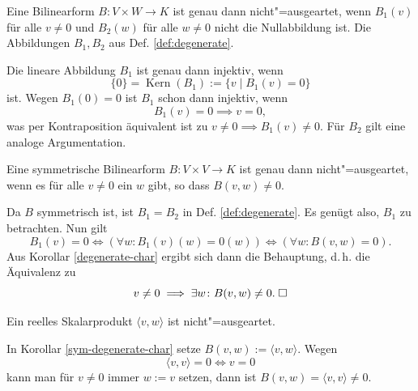 \begin{Korollar}\label{degenerate-char}
Eine Bilinearform $B\colon V\times W\to K$ ist genau dann
nicht"=ausgeartet, wenn $B_1(v)$ für alle $v\ne 0$ und $B_2(w)$ für
alle $w\ne 0$ nicht die Nullabbildung ist. Die Abbildungen $B_1,B_2$
aus Def. \ref{def:degenerate}.
\end{Korollar}
\begin{Beweis}
Die lineare Abbildung $B_1$ ist genau dann injektiv, wenn
\begin{equation}
\{0\} = \operatorname{Kern}(B_1) := \{v\mid B_1(v)=0\}
\end{equation}
ist. Wegen $B_1(0)=0$ ist $B_1$ schon dann injektiv, wenn
\begin{equation}
B_1(v)=0\implies v=0,
\end{equation}
was per Kontraposition äquivalent ist zu $v\ne 0\implies B_1(v)\ne 0$.
Für $B_2$ gilt eine analoge Argumentation.\;\qedsymbol
\end{Beweis}
\begin{Korollar}\label{sym-degenerate-char}
Eine symmetrische Bilinearform $B\colon V\times V\to K$ ist genau
dann nicht"=ausgeartet, wenn es für alle $v\ne 0$ ein $w$ gibt, so
dass $B(v,w)\ne 0$.
\end{Korollar}
\begin{Beweis}
Da $B$ symmetrisch ist, ist $B_1=B_2$ in Def. \ref{def:degenerate}.
Es genügt also, $B_1$ zu
betrachten. Nun gilt%
\begin{equation}
B_1(v)=0 \iff (\forall w\colon B_1(v)(w)=0(w)) \iff (\forall w\colon B(v,w)=0).
\end{equation}
Aus Korollar \ref{degenerate-char} ergibt sich dann die Behauptung,
d.\,h. die Äquivalenz zu
\begin{equation}
v\ne 0\implies \exists w\colon B(v,w)\ne 0.\;\square
\end{equation}
\end{Beweis}
\begin{Korollar}
Ein reelles Skalarprodukt $\langle v,w\rangle$ ist nicht"=ausgeartet.
\end{Korollar}
\begin{Beweis}
In Korollar \ref{sym-degenerate-char} setze
$B(v,w):=\langle v,w\rangle$. Wegen
\begin{equation}
\langle v,v\rangle = 0 \iff v=0
\end{equation}
kann man für $v\ne 0$ immer $w:=v$ setzen, dann ist
$B(v,w)=\langle v,v\rangle\ne 0$.\;\qedsymbol
\end{Beweis}

